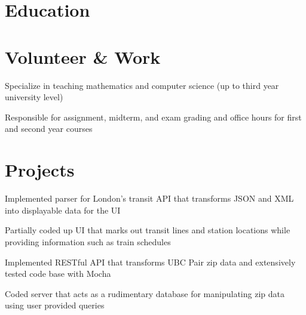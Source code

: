 \documentclass[]{deedy-resume-openfont}
\begin{document}
~\\~\\

\section{Education}
\sectionsep

\section{Volunteer \& Work}
\descript{}
\begin{tightemize}
\item Specialize in teaching mathematics and computer science (up to third year university level)
\end{tightemize}
\sectionsep

\begin{tightemize}
\item Responsible for assignment, midterm, and exam grading and office hours for first and second year courses
\end{tightemize}
\sectionsep

\section{Projects}

\begin{tightemize}
\item Implemented parser for London's transit API that transforms JSON and XML into displayable data for the UI
\item Partially coded up UI that marks out transit lines and station locations while providing information such as train schedules
\end{tightemize}
\sectionsep

\begin{tightemize}
\item Implemented RESTful API that transforms UBC Pair zip data and extensively tested code base with Mocha
\item Coded server that acts as a rudimentary database for manipulating zip data using user provided queries
\end{tightemize}
\sectionsep
\end{document}
